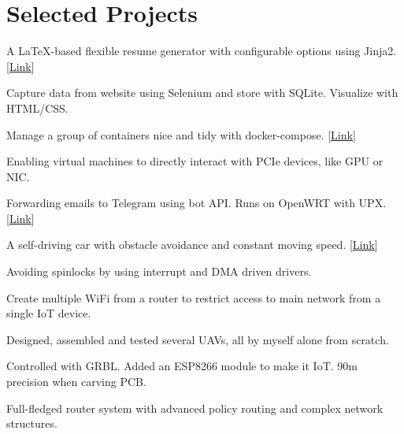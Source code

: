 \documentclass[letterpaper,11pt]{article}
\newcommand{\resumeSubHeadingListStart}{\begin{itemize}[leftmargin=0pt,label={}]}
\newcommand{\resumeSubHeadingListEnd}{\end{itemize}}
\begin{document}
\section{Selected Projects}{
    \resumeSubHeadingListStart
        {A \LaTeX-based flexible resume generator with configurable options using Jinja2. [\href{https://github.com/ly4096x/Flexible\_Resume}{\underline{Link}}]}{}

        {Capture data from website using Selenium and store with SQLite. Visualize with HTML/CSS.}{}

        {Manage a group of containers nice and tidy with docker-compose. [\href{https://github.com/ly4096x/ECE6383\_HSN\_Lab4\_Network}{\underline{Link}}]}{}

        {Enabling virtual machines to directly interact with PCIe devices, like GPU or NIC.}{}

        {Forwarding emails to Telegram using bot API. Runs on OpenWRT with UPX. [\href{https://github.com/ly4096x/smtp\_to\_telegram}{\underline{Link}}]}{}

        {A self-driving car with obstacle avoidance and constant moving speed. [\href{https://github.com/ly4096x/RTES\_STM32F4}{\underline{Link}}]}{}

        {Avoiding spinlocks by using interrupt and DMA driven drivers.}{}

        {Create multiple WiFi from a router to restrict access to main network from a single IoT device.}{}

        {Designed, assembled and tested several UAVs, all by myself alone from scratch.}{}

        {Controlled with GRBL. Added an ESP8266 module to make it IoT. 90{\textmu}m precision when carving PCB.}{}

        {Full-fledged router system with advanced policy routing and complex network structures.}{}
    \resumeSubHeadingListEnd
}

\end{document}
